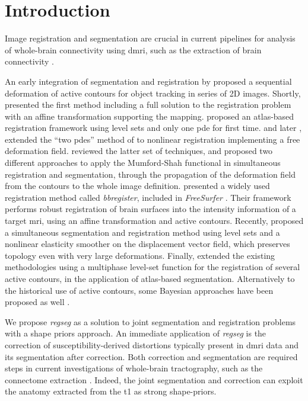 \section{Introduction}%
\label{sec:introduction}
Image registration and segmentation are crucial in current pipelines for
  analysis of whole-brain connectivity using \gls*{dmri}, such as the extraction
  of brain connectivity \citep{craddock_imaging_2013}.

An early integration of segmentation and registration by \cite{bertalmio_morphing_2000} proposed
  a sequential deformation of active contours for object tracking in series of 2D images.
Shortly, \cite{yezzi_variational_2003} presented the first method including a full solution to
  the registration problem with an affine transformation supporting the mapping.
\cite{vemuri_joint_2003} proposed an atlas-based registration framework using level sets and only
  one \gls*{pde} for first time.
\cite{unal_coupled_2005} and later \cite{wang_joint_2006},
  extended the ``two \glspl*{pde}'' method of \cite{yezzi_variational_2003}
  to nonlinear registration implementing a free deformation field.
\cite{droske_mumfordshah_2009} reviewed the latter set of techniques, and proposed two different
  approaches to apply the Mumford-Shah functional \citep{mumford_optimal_1989} in simultaneous
  registration and segmentation, through the propagation of the deformation field from
  the contours to the whole image definition.
\cite{greve_accurate_2009} presented a widely used registration method called \emph{bbregister},
  included in \emph{FreeSurfer} \citep{fischl_freesurfer_2012}.
Their framework performs robust registration of brain surfaces into the intensity information
  of a target \gls*{mri}, using an affine transformation and active contours.
Recently, \cite{guyader_combined_2011} proposed a simultaneous segmentation and
  registration method using level sets and a nonlinear elasticity smoother on the
  displacement vector field, which preserves topology even with very large deformations.
Finally, \cite{gorthi_active_2011} extended the existing methodologies using a multiphase
  level-set function for the registration of several active contours, in the application
  of atlas-based segmentation.
Alternatively to the historical use of active contours, some Bayesian approaches
  have been proposed as well \citep{wyatt_map_2003,pohl_bayesian_2006,gass_simultaneous_2014}.

We propose \emph{regseg} as a solution to joint segmentation and registration 
  problems with a shape priors approach.
An immediate application of \emph{regseg} is the correction of susceptibility-derived
  distortions typically present in \gls*{dmri} data and its segmentation
  after correction.
Both correction and segmentation are required steps in current investigations of whole-brain
  tractography, such as the connectome extraction \citep{daducci_connectome_2012}.
Indeed, the joint segmentation and correction can exploit the anatomy extracted from
  the \gls*{t1} as strong shape-priors.